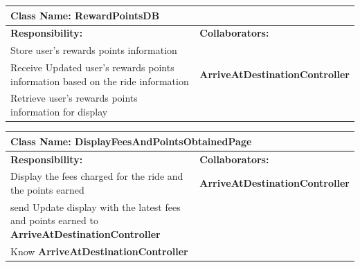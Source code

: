 \documentclass[]{article}
\begin{document}
\begin{table}[H]
    \centering
    \begin{tabular}{|p{5cm}|p{5cm}|}
    \hline
    \multicolumn{2}{|l|}{\textbf{Class Name:} RewardPointsDB} \\
    \hline
    \textbf{Responsibility:} & \textbf{Collaborators:} \\
    \hline
    Store user's rewards points information & \phantom{} \\
    \hline
    Receive Updated user's rewards points information based on the ride information & \textbf{ArriveAtDestinationController} \\
    \hline
    Retrieve user's rewards points information for display & \phantom{} \\
    \hline
    \end{tabular}
\end{table}

\begin{table}[H]
    \centering
    \begin{tabular}{|p{5cm}|p{5cm}|}
    \hline
    \multicolumn{2}{|l|}{\textbf{Class Name:} DisplayFeesAndPointsObtainedPage} \\
    \hline
    \textbf{Responsibility:} & \textbf{Collaborators:} \\
    \hline
    Display the fees charged for the ride and the points earned & \textbf{ArriveAtDestinationController} \\
    \hline
    send Update display with the latest fees and points earned to \textbf{ArriveAtDestinationController} & \phantom{} \\
    \hline
     Know \textbf{ArriveAtDestinationController}  & \phantom{} \\
    \hline
    
    
    \end{tabular}
\end{table}
\end{document}
